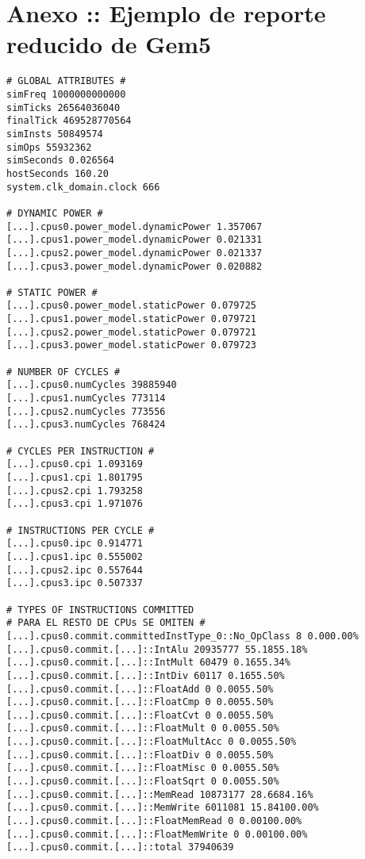 \chapter{Anexo :: Ejemplo de reporte reducido de Gem5}
\label{cap:AnexoMiscelaneos}

\begin{lstlisting}[basicstyle=\ttfamily,label=metricasCompletas,showstringspaces=false]
# GLOBAL ATTRIBUTES #
simFreq 1000000000000
simTicks 26564036040
finalTick 469528770564
simInsts 50849574
simOps 55932362
simSeconds 0.026564
hostSeconds 160.20
system.clk_domain.clock 666

# DYNAMIC POWER #
[...].cpus0.power_model.dynamicPower 1.357067
[...].cpus1.power_model.dynamicPower 0.021331
[...].cpus2.power_model.dynamicPower 0.021337
[...].cpus3.power_model.dynamicPower 0.020882

# STATIC POWER #
[...].cpus0.power_model.staticPower 0.079725
[...].cpus1.power_model.staticPower 0.079721
[...].cpus2.power_model.staticPower 0.079721
[...].cpus3.power_model.staticPower 0.079723

# NUMBER OF CYCLES #
[...].cpus0.numCycles 39885940
[...].cpus1.numCycles 773114
[...].cpus2.numCycles 773556
[...].cpus3.numCycles 768424

# CYCLES PER INSTRUCTION #
[...].cpus0.cpi 1.093169
[...].cpus1.cpi 1.801795
[...].cpus2.cpi 1.793258
[...].cpus3.cpi 1.971076

# INSTRUCTIONS PER CYCLE #
[...].cpus0.ipc 0.914771
[...].cpus1.ipc 0.555002
[...].cpus2.ipc 0.557644
[...].cpus3.ipc 0.507337

# TYPES OF INSTRUCTIONS COMMITTED
# PARA EL RESTO DE CPUs SE OMITEN #
[...].cpus0.commit.committedInstType_0::No_OpClass 8 0.000.00%
[...].cpus0.commit.[...]::IntAlu 20935777 55.1855.18%
[...].cpus0.commit.[...]::IntMult 60479 0.1655.34%
[...].cpus0.commit.[...]::IntDiv 60117 0.1655.50%
[...].cpus0.commit.[...]::FloatAdd 0 0.0055.50%
[...].cpus0.commit.[...]::FloatCmp 0 0.0055.50%
[...].cpus0.commit.[...]::FloatCvt 0 0.0055.50%
[...].cpus0.commit.[...]::FloatMult 0 0.0055.50%
[...].cpus0.commit.[...]::FloatMultAcc 0 0.0055.50%
[...].cpus0.commit.[...]::FloatDiv 0 0.0055.50%
[...].cpus0.commit.[...]::FloatMisc 0 0.0055.50%
[...].cpus0.commit.[...]::FloatSqrt 0 0.0055.50%
[...].cpus0.commit.[...]::MemRead 10873177 28.6684.16%
[...].cpus0.commit.[...]::MemWrite 6011081 15.84100.00%
[...].cpus0.commit.[...]::FloatMemRead 0 0.00100.00%
[...].cpus0.commit.[...]::FloatMemWrite 0 0.00100.00%
[...].cpus0.commit.[...]::total 37940639



\end{lstlisting}
